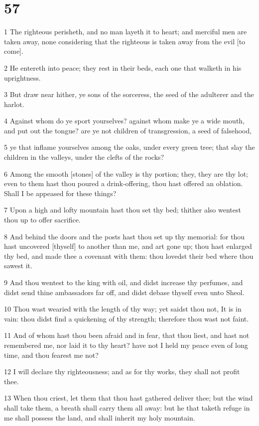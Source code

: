 \chapter{57}

\par 1 The righteous perisheth, and no man layeth it to heart; and merciful men are taken away, none considering that the righteous is taken away from the evil [to come].
\par 2 He entereth into peace; they rest in their beds, each one that walketh in his uprightness.
\par 3 But draw near hither, ye sons of the sorceress, the seed of the adulterer and the harlot.
\par 4 Against whom do ye sport yourselves? against whom make ye a wide mouth, and put out the tongue? are ye not children of transgression, a seed of falsehood,
\par 5 ye that inflame yourselves among the oaks, under every green tree; that slay the children in the valleys, under the clefts of the rocks?
\par 6 Among the smooth [stones] of the valley is thy portion; they, they are thy lot; even to them hast thou poured a drink-offering, thou hast offered an oblation. Shall I be appeased for these things?
\par 7 Upon a high and lofty mountain hast thou set thy bed; thither also wentest thou up to offer sacrifice.
\par 8 And behind the doors and the posts hast thou set up thy memorial: for thou hast uncovered [thyself] to another than me, and art gone up; thou hast enlarged thy bed, and made thee a covenant with them: thou lovedst their bed where thou sawest it.
\par 9 And thou wentest to the king with oil, and didst increase thy perfumes, and didst send thine ambassadors far off, and didst debase thyself even unto Sheol.
\par 10 Thou wast wearied with the length of thy way; yet saidst thou not, It is in vain: thou didst find a quickening of thy strength; therefore thou wast not faint.
\par 11 And of whom hast thou been afraid and in fear, that thou liest, and hast not remembered me, nor laid it to thy heart? have not I held my peace even of long time, and thou fearest me not?
\par 12 I will declare thy righteousness; and as for thy works, they shall not profit thee.
\par 13 When thou criest, let them that thou hast gathered deliver thee; but the wind shall take them, a breath shall carry them all away: but he that taketh refuge in me shall possess the land, and shall inherit my holy mountain.
